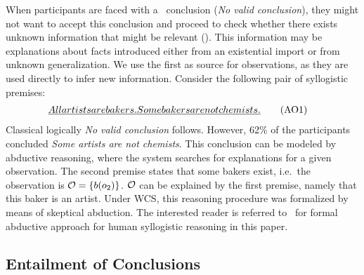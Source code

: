 \documentclass[12pt]{article}
\begin{document}
When participants are faced with a \NVC\ conclusion (\textit{No valid conclusion}), they might not want to accept this conclusion and proceed to check whether there exists unknown information that might be relevant (\abduction). This information may be explanations about
facts introduced either from an existential import or from unknown generalization. 
We use the first as source for observations, as they are used directly to infer new information. 
Consider the following pair of syllogistic premises: 
\begin{align}
 \emph{All artists are bakers. } & \emph{Some bakers are not chemists.} \tag{AO1} 
\end{align}
Classical logically \textit{No valid conclusion} follows. However, 62\% of the participants concluded \textit{Some artists are not chemists}.
This conclusion can be modeled by abductive reasoning, where the system searches for explanations
for a given observation. The second premise states that some bakers exist, i.e.\ the observation is ${\cal O} = \{b(o_2) \}$. ${\cal O}$ can be explained by the first premise, namely that
this baker is an artist. Under WCS, this reasoning procedure was formalized by means of skeptical abduction.
The interested reader is referred to~\cite{cogsci:2017} for 
formal abductive approach for human syllogistic reasoning in this paper.



\subsection{Entailment of Conclusions}\label{sect:entail}
\end{document}
